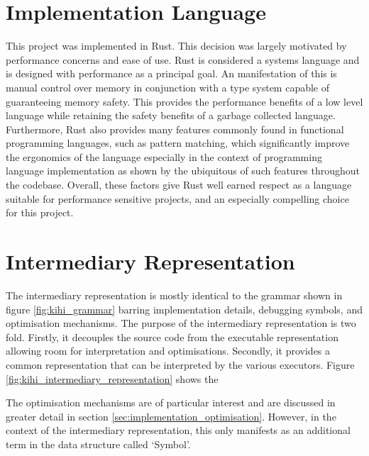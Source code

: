 \section{Implementation Language}
This project was implemented in Rust. This decision was largely motivated by performance concerns and ease of use. Rust is considered a systems language and is designed with performance as a principal goal. An manifestation of this is manual control over memory in conjunction with a type system capable of guaranteeing memory safety. This provides the performance benefits of a low level language while retaining the safety benefits of a garbage collected language. Furthermore, Rust also provides many features commonly found in functional programming languages, such as pattern matching, which significantly improve the ergonomics of the language especially in the context of programming language implementation as shown by the ubiquitous of such features throughout the codebase. Overall, these factors give Rust well earned respect as a language suitable for performance sensitive projects, and an especially compelling choice for this project.


\section{Intermediary Representation}\label{sec:implementation_intermediary_representation}
The intermediary representation is mostly identical to the grammar shown in figure \ref{fig:kihi_grammar} barring implementation details, debugging symbols, and optimisation mechanisms. The purpose of the intermediary representation is two fold. Firstly, it decouples the source code from the executable representation allowing room for interpretation and optimisations. Secondly, it provides a common representation that can be interpreted by the various executors. Figure \ref{fig:kihi_intermediary_representation} shows the





The optimisation mechanisms are of particular interest and are discussed in greater detail in section \ref{sec:implementation_optimisation}. However, in the context of the intermediary representation, this only manifests as an additional term in the data structure called `Symbol'.

